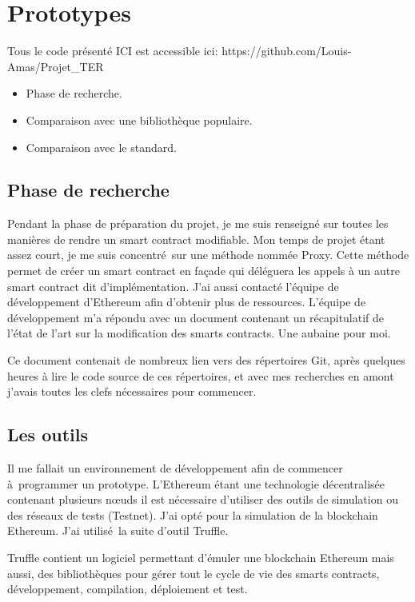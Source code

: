 \section{Prototypes}

Tous le code présenté ICI est accessible ici:
https://github.com/Louis-Amas/Projet\_TER

\begin{itemize}
    \item Phase de recherche.
    \item Comparaison avec une bibliothèque populaire.
    \item Comparaison avec le standard.
\end{itemize}

\subsection{Phase de recherche}

Pendant la phase de préparation du projet, je me suis renseigné sur toutes les manières de rendre un smart contract modifiable.
Mon temps de projet étant assez court, je me suis concentré sur une méthode nommée Proxy. Cette méthode permet de créer un
smart contract en façade qui déléguera les appels à un autre smart contract dit d'implémentation. J'ai aussi contacté
l'équipe de développement d'Ethereum afin d'obtenir plus de ressources. L'équipe de développement m'a répondu avec un document
contenant un récapitulatif de l'état de l'art sur la modification des smarts contracts. Une aubaine pour moi.

Ce document contenait de nombreux lien vers des répertoires Git, après quelques heures à lire le code source de ces répertoires,
et avec mes recherches en amont j'avais toutes les clefs nécessaires pour commencer. 

\subsection{Les outils}

Il me fallait un environnement de développement afin de commencer à programmer un prototype. L'Ethereum étant une technologie
décentralisée contenant plusieurs nœuds il est nécessaire d'utiliser des outils de simulation ou des réseaux de tests (Testnet).
J'ai opté pour la simulation de la blockchain Ethereum. J'ai utilisé la suite d'outil Truffle.

Truffle contient un logiciel permettant d'émuler une blockchain Ethereum mais aussi, des bibliothèques pour gérer tout le cycle 
de vie des smarts contracts, développement, compilation, déploiement et test.

